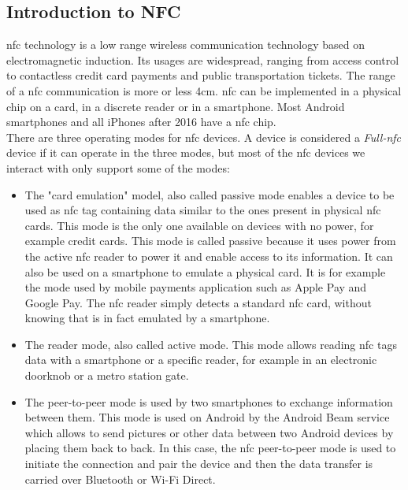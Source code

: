 \documentclass[twoside, openright,11pt,a4paper]{book}
\begin{document}
\subsection{Introduction to NFC}
\gls{nfc} technology is a low range wireless communication technology based on electromagnetic induction. Its usages are widespread, ranging from access control to contactless credit card payments and public transportation tickets. The range of a \gls{nfc} communication is more or less 4cm. \gls{nfc} can be implemented in a physical chip on a card, in a discrete reader or in a smartphone. Most Android smartphones and all iPhones after 2016 have a \gls{nfc} chip. \\

There are three operating modes for \gls{nfc} devices. A device is considered a \emph{Full-\gls{nfc}} device if it can operate in the three modes, but most of the \gls{nfc} devices we interact with only support some of the modes:
\begin{itemize}
	\item The "card emulation" model, also called passive mode enables a device to be used as \gls{nfc} tag containing data similar to the ones present in physical \gls{nfc} cards. This mode is the only one available on devices with no power, for example credit cards. This mode is called passive because it uses power from the active \gls{nfc} reader to power it and enable access to its information. It can also be used on a smartphone to emulate a physical card. It is for example the mode used by mobile payments application such as Apple Pay and Google Pay. The \gls{nfc} reader simply detects a standard \gls{nfc} card, without knowing that is in fact emulated by a smartphone.
	\item The reader mode, also called active mode. This mode allows reading \gls{nfc} tags data with a smartphone or a specific reader, for example in an electronic doorknob or a metro station gate.
	\item The peer-to-peer mode is used by two smartphones to exchange information between them. This mode is used on Android by the Android Beam service which allows to send pictures or other data between two Android devices by placing them back to back. In this case, the \gls{nfc} peer-to-peer mode is used to initiate the connection and pair the device and then the data transfer is carried over Bluetooth or Wi-Fi Direct.
\end{itemize}
\end{document}
